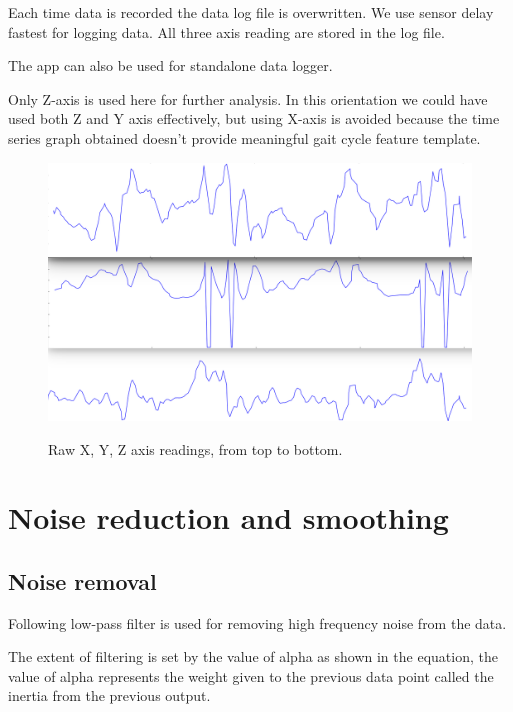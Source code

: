 \documentclass[a4paper]{report}
\begin{document}
Each time data is recorded the data log file is overwritten.
We use sensor delay fastest for logging data. All three axis reading are stored in the log file.\newline

The app can also be used for standalone data logger.\newline

Only Z-axis is used here for further analysis. In this orientation we could have used both Z and Y axis effectively, but using X-axis is avoided because the time series graph obtained doesn’t provide meaningful gait cycle feature template.\\

\begin{figure}
\includegraphics[scale=0.3]{pictures/XYZcrop.png}\\[1.0cm]
\caption{Raw X, Y, Z axis readings, from top to bottom. }
\end{figure}


\newpage
\chapter{Noise reduction and smoothing}
\section{Noise removal}

Following low-pass filter is used for removing high frequency noise from the data.\cite{lowpass}

The extent of filtering is set by the value of alpha as shown in the equation, the value of alpha represents the weight given to the previous data point called the inertia from the previous output.
\end{document}
